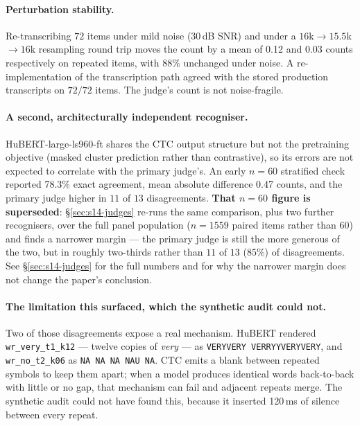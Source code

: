 \documentclass[11pt]{article}
\begin{document}
\paragraph{Perturbation stability.}
Re-transcribing $72$ items under mild noise (30\,dB SNR) and under a
$16$k$\rightarrow$$15.5$k$\rightarrow$$16$k resampling round trip moves the count
by a mean of 0.12 and 0.03 counts respectively on repeated items, with
88\% unchanged under noise. A re-implementation of the transcription path
agreed with the stored production transcripts on $72/72$ items. The judge's count
is not noise-fragile.

\paragraph{A second, architecturally independent recogniser.}
HuBERT-large-ls960-ft shares the CTC output structure but not the pretraining
objective (masked cluster prediction rather than contrastive), so its errors are
not expected to correlate with the primary judge's. An early $n{=}60$
stratified check reported 78.3\% exact agreement, mean absolute difference
0.47 counts, and the primary judge higher in $11$ of $13$ disagreements.
\textbf{That $n{=}60$ figure is superseded}: \S\ref{sec:s14-judges} re-runs the
same comparison, plus two further recognisers, over the full panel population
($n{=}1559$ paired items rather than $60$) and finds a narrower margin --- the
primary judge is still the more generous of the two, but in roughly
two-thirds rather than $11$ of $13$ ($85\%$) of disagreements. See
\S\ref{sec:s14-judges} for the full numbers and for why the narrower margin
does not change the paper's conclusion.

\paragraph{The limitation this surfaced, which the synthetic audit could not.}
Two of those disagreements expose a real mechanism. HuBERT rendered
\texttt{wr\_very\_t1\_k12} --- twelve copies of \emph{very} --- as
\texttt{VERYVERY VERRYYVERYVERY}, and \texttt{wr\_no\_t2\_k06} as
\texttt{NA NA NA NAU NA}. CTC emits a blank between repeated symbols to keep them
apart; when a model produces identical words back-to-back with little or no gap,
that mechanism can fail and adjacent repeats merge. The synthetic audit could not
have found this, because it inserted 120\,ms of silence between
every repeat.
\end{document}

